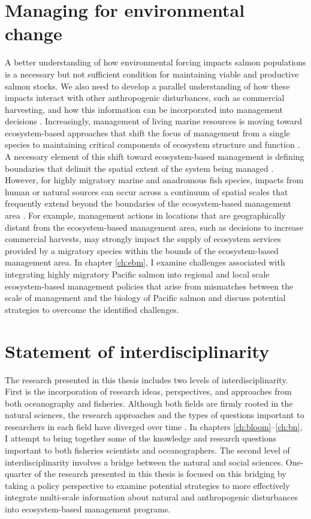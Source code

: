 \section{Managing for environmental change}

A better understanding of how environmental forcing impacts salmon populations
is a necessary but not sufficient condition for maintaining viable and
productive salmon stocks. We also need to develop a parallel understanding of
how these impacts interact with other anthropogenic disturbances, such as
commercial harvesting, and how this information can be incorporated into
management decisions \citep{Link2002a}. Increasingly, management of living
marine resources is moving toward ecosystem-based approaches that shift the
focus of management from a single species to maintaining critical components of
ecosystem structure and function \citep{Grumbine1994, Murawski2007a, Long2015}.
A necessary element of this shift toward ecosystem-based management is defining
boundaries that delimit the spatial extent of the system being managed
\citep{Engler2015, Yaffee1999}. However, for highly migratory marine and
anadromous fish species, impacts from human or natural sources can occur across
a continuum of spatial scales that frequently extend beyond the boundaries of
the ecosystem-based management area \citep{Dallimer2015}. For example,
management actions in locations that are geographically distant from the
ecosystem-based management area, such as decisions to increase commercial
harvests, may strongly impact the supply of ecosystem services provided by a
migratory species within the bounds of the ecosystem-based management area. In
chapter \ref{ch:ebm}, I examine challenges associated with integrating highly
migratory Pacific salmon into regional and local scale ecosystem-based
management policies that arise from mismatches between the scale of management
and the biology of Pacific salmon and discuss potential strategies to overcome
the identified challenges.


\section{Statement of interdisciplinarity}

The research presented in this thesis includes two levels of
interdisciplinarity. First is the incorporation of research ideas, perspectives,
and approaches from both oceanography and fisheries. Although both fields are
firmly rooted in the natural sciences, the research approaches and the types of
questions important to researchers in each field have diverged over time
\citep{Platt2007a}. In chapters \ref{ch:bloom}--\ref{ch:bn}, I attempt to bring
together some of the knowledge and research questions important to both
fisheries scientists and oceanographers. The second level of interdisciplinarity
involves a bridge between the natural and social sciences. One-quarter of the
research presented in this thesis is focused on this bridging by taking a policy
perspective to examine potential strategies to more effectively integrate
multi-scale information about natural and anthropogenic disturbances into
ecosystem-based management programs.


